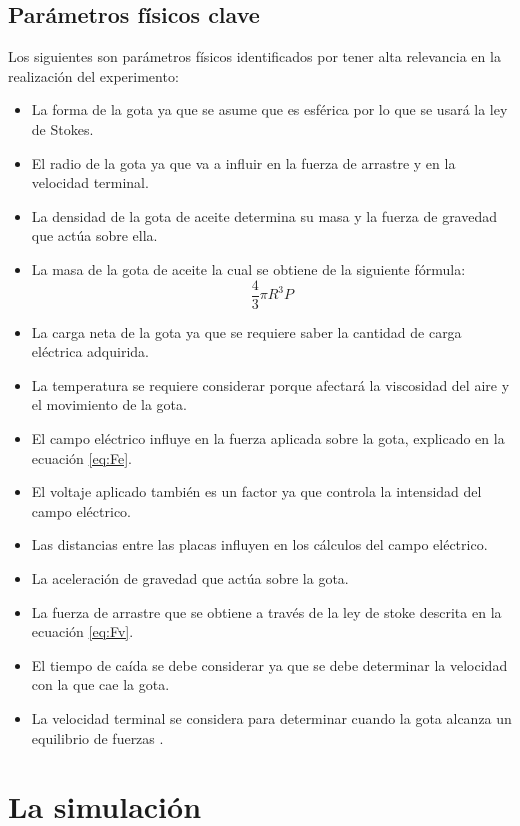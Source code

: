 \documentclass[
 reprint,
 amsmath,amssymb,
 aps,
]{revtex4-2}
\begin{document}
\subsection{\label{sec:levels}Parámetros físicos clave}
Los siguientes son parámetros físicos identificados por tener alta relevancia en la realización del experimento:
\begin{itemize}
    \item La forma de la gota ya que se asume que es esférica por lo que se usará la ley de Stokes.
    \item El radio de la gota ya que va a influir en la fuerza de arrastre y en la velocidad terminal.
    \item La densidad de la gota de aceite determina su masa y la fuerza de gravedad que actúa sobre ella.
    \item La masa de la gota de aceite la cual se obtiene de la siguiente fórmula: 
    \begin{equation}
        \frac{4}{3}\pi R^3P
    \end{equation}
    \item La carga neta de la gota ya que se requiere saber la cantidad de carga eléctrica adquirida. 
    \item La temperatura se requiere considerar porque afectará la viscosidad del aire y el movimiento de la gota.
    \item El campo eléctrico influye en la fuerza aplicada sobre la gota, explicado en la ecuación \ref{eq:Fe}.
    \item El voltaje aplicado también es un factor ya que controla la intensidad del campo eléctrico.
    \item Las distancias entre las placas influyen en los cálculos del campo eléctrico.
    \item La aceleración de gravedad que actúa sobre la gota.
    \item La fuerza de arrastre que se obtiene a través de la ley de stoke descrita en la ecuación \ref{eq:Fv}.
    \item El tiempo de caída se debe considerar ya que se debe determinar la velocidad con la que cae la gota.
    \item La velocidad terminal se considera para determinar cuando la gota alcanza un equilibrio de fuerzas \cite{UofToronto_sf}\cite{RSEF2011}.
\end{itemize}

\section{\label{sec:levels}La simulación}
\end{document}
